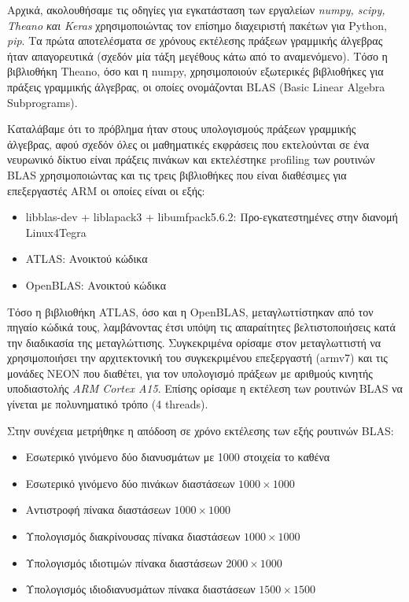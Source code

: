 Αρχικά, ακολουθήσαμε τις οδηγίες για εγκατάσταση των εργαλείων \emph{numpy, scipy, Theano και Keras}
χρησιμοποιώντας τον επίσημο διαχειριστή πακέτων για Python, \emph{pip}.
Τα πρώτα αποτελέσματα σε χρόνους εκτέλεσης πράξεων γραμμικής άλγεβρας ήταν
απαγορευτικά (σχεδόν μία τάξη μεγέθους κάτω από το αναμενόμενο).
Τόσο η βιβλιοθήκη Theano, όσο και η numpy, χρησιμοποιούν εξωτερικές βιβλιοθήκες
για πράξεις γραμμικής άλγεβρας, οι οποίες ονομάζονται BLAS (Basic Linear Algebra Subprograms).

Καταλάβαμε ότι το πρόβλημα ήταν στους υπολογισμούς πράξεων γραμμικής άλγεβρας,
αφού σχεδόν όλες οι μαθηματικές εκφράσεις που εκτελούνται σε ένα
νευρωνικό δίκτυο είναι πράξεις πινάκων και εκτελέστηκε profiling των
ρουτινών BLAS χρησιμοποιώντας και τις τρεις βιβλιοθήκες που είναι διαθέσιμες για
επεξεργαστές ARM οι οποίες είναι οι εξής:
\begin{itemize}
  \item{libblas-dev + liblapack3 + libumfpack5.6.2: Προ-εγκατεστημένες στην διανομή Linux4Tegra}
  \item{ATLAS: Ανοικτού κώδικα}
  \item{OpenBLAS: Ανοικτού κώδικα}
\end{itemize}

Τόσο η βιβλιοθήκη ATLAS, όσο και η OpenBLAS, μεταγλωττίστηκαν από τον πηγαίο κώδικά τους,
λαμβάνοντας έτσι υπόψη τις απαραίτητες βελτιστοποιήσεις κατά την διαδικασία
της μεταγλώττισης. 
Συγκεκριμένα ορίσαμε στον μεταγλωττιστή να χρησιμοποιήσει την αρχιτεκτονική του
συγκεκριμένου επεξεργαστή (armv7) και τις μονάδες
NEON που διαθέτει, για τον υπολογισμό πράξεων με αριθμούς κινητής %
υποδιαστολής \emph{ARM Cortex A15}. Επίσης ορίσαμε η εκτέλεση των ρουτινών
BLAS να γίνεται με πολυνηματικό τρόπο (4 threads).

Στην συνέχεια μετρήθηκε η απόδοση σε χρόνο εκτέλεσης των εξής ρουτινών BLAS:
\begin{itemize}
  \item{Εσωτερικό γινόμενο δύο διανυσμάτων με 1000 στοιχεία το καθένα}
  \item{Εσωτερικό γινόμενο δύο πινάκων διαστάσεων $1000 \times 1000$}
  \item{Αντιστροφή πίνακα διαστάσεων $1000 \times 1000$}
  \item{Υπολογισμός διακρίνουσας πίνακα διαστάσεων $1000 \times 1000$}
  \item{Υπολογισμός ιδιοτιμών πίνακα διαστάσεων $2000 \times 1000$}
  \item{Υπολογισμός ιδιοδιανυσμάτων πίνακα διαστάσεων $1500 \times 1500$}
\end{itemize}

